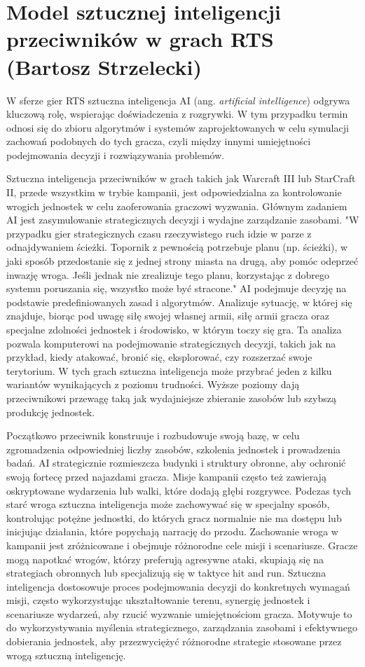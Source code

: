 \section{Model sztucznej inteligencji przeciwników w grach RTS (Bartosz Strzelecki)}\label{s:ai_wpr}
W sferze gier RTS sztuczna inteligencja AI (ang.  \textit{artificial intelligence}) odgrywa kluczową rolę, wspierając doświadczenia z rozgrywki.
W tym przypadku termin odnosi się do zbioru algorytmów i systemów zaprojektowanych w celu symulacji
zachowań podobnych do tych gracza, czyli między innymi umiejętności podejmowania decyzji i rozwiązywania problemów.

Sztuczna inteligencja przeciwników w grach takich jak Warcraft III lub StarCraft II, przede wszystkim w trybie kampanii,
jest odpowiedzialna za kontrolowanie wrogich jednostek w celu zaoferowania graczowi wyzwania. Głównym zadaniem AI jest zasymulowanie
strategicznych decyzji i wydajne zarządzanie zasobami.
"W przypadku gier strategicznych czasu rzeczywistego ruch idzie w parze z odnajdywaniem ścieżki. Topornik z pewnością potrzebuje planu (np. ścieżki), w jaki sposób przedostanie się z jednej strony miasta na drugą, aby pomóc odeprzeć inwazję wroga. Jeśli jednak nie zrealizuje tego planu, korzystając z dobrego systemu poruszania się, wszystko może być stracone."\cite{units}
AI podejmuje decyzję na podstawie predefiniowanych zasad i algorytmów. Analizuje sytuację, w której się znajduje, biorąc pod uwagę
siłę swojej własnej armii, siłę armii gracza oraz specjalne zdolności jednostek i środowisko, w którym toczy się gra.
Ta analiza pozwala komputerowi na podejmowanie strategicznych decyzji, takich jak na przykład, kiedy atakować, bronić się, eksplorować, czy rozszerzać swoje terytorium.
W tych grach sztuczna inteligencja może przybrać jeden z kilku wariantów wynikających z poziomu trudności. Wyższe poziomy
dają przeciwnikowi przewagę taką jak wydajniejsze zbieranie zasobów lub szybszą produkcję jednostek.

Początkowo przeciwnik konstruuje i rozbudowuje swoją bazę, w celu zgromadzenia odpowiedniej liczby zasobów, szkolenia jednostek i prowadzenia badań.
AI strategicznie rozmieszcza budynki i struktury obronne, aby ochronić swoją fortecę przed najazdami gracza. 
Misje kampanii często też zawierają oskryptowane wydarzenia lub walki, które dodają głębi rozgrywce. Podczas tych starć wroga sztuczna inteligencja
może zachowywać się w specjalny sposób, kontrolując potężne jednostki, do których gracz normalnie nie ma dostępu lub inicjując działania, które popychają
narrację do przodu.
Zachowanie wroga w kampanii jest zróżnicowane i obejmuje różnorodne cele misji i scenariusze. Gracze mogą napotkać wrogów, którzy preferują agresywne ataki,
skupiają się na strategiach obronnych lub specjalizują się w taktyce hit and run. Sztuczna inteligencja dostosowuje proces podejmowania decyzji do
konkretnych wymagań misji, często wykorzystując ukształtowanie terenu, synergię jednostek i scenariusze wydarzeń, aby rzucić wyzwanie umiejętnościom gracza.
Motywuje to do wykorzystywania myślenia strategicznego, zarządzania zasobami i efektywnego dobierania jednostek, aby przezwyciężyć różnorodne strategie stosowane przez wrogą sztuczną inteligencję.

